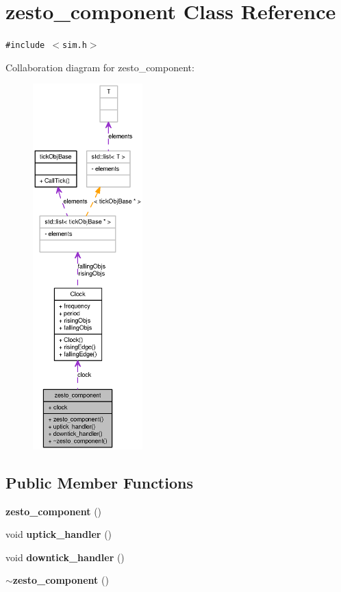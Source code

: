 \section{zesto\_\-component Class Reference}
\label{classzesto__component}
{\tt \#include $<$sim.h$>$}

Collaboration diagram for zesto\_\-component:\nopagebreak
\begin{figure}[H]
\begin{center}
\leavevmode
\includegraphics[height=400pt]{classzesto__component__coll__graph}
\end{center}
\end{figure}
\subsection*{Public Member Functions}
\begin{CompactItemize}
\item 
{\bf zesto\_\-component} ()
\item 
void {\bf uptick\_\-handler} ()
\item 
void {\bf downtick\_\-handler} ()
\item 
{\bf $\sim$zesto\_\-component} ()
\end{CompactItemize}
